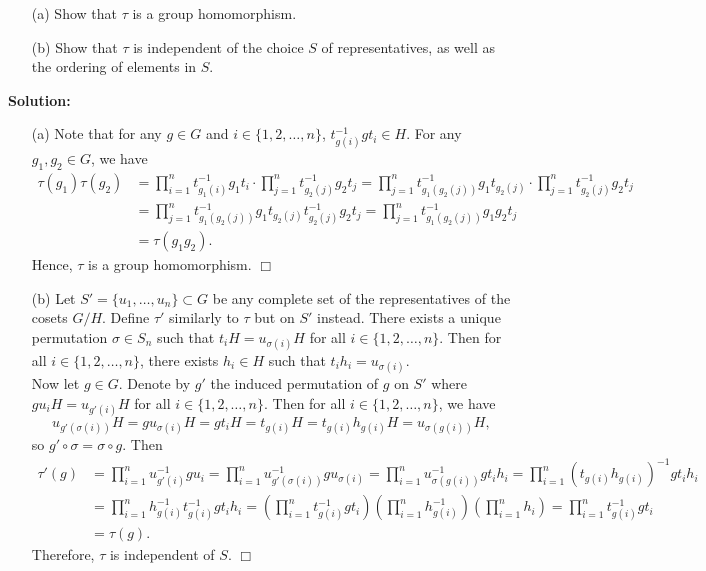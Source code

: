 \documentclass[12pt]{article}
\begin{document}
\begin{enumerate}
    \item[(a)] Show that $\tau$ is a group homomorphism. 
    \item[(b)] Show that $\tau$ is independent of the choice $S$ of representatives, as well as the ordering of elements in $S$.
\end{enumerate}
\noindent \textbf{Solution:} 
\begin{enumerate}
    \item[(a)] Note that for any $g \in G$ and $i \in \{1, 2, \dots, n\}$, $t_{g(i)}^{-1}gt_i \in H$. For any $g_1, g_2 \in G$, we have 
    \begin{align*}
        \tau(g_1)\tau(g_2) &= \prod_{i=1}^n t_{g_1(i)}^{-1}g_1t_i \cdot \prod_{j=1}^n t_{g_2(j)}^{-1}g_2t_j = \prod_{j=1}^n t_{g_1(g_2(j))}^{-1}g_1t_{g_2(j)} \cdot \prod_{j=1}^n t_{g_2(j)}^{-1}g_2t_j \\
        &= \prod_{j=1}^n t_{g_1(g_2(j))}^{-1}g_1t_{g_2(j)} t_{g_2(j)}^{-1}g_2t_j = \prod_{j=1}^n t_{g_1(g_2(j))}^{-1}g_1g_2t_j \\
        &= \tau(g_1g_2).
    \end{align*}
    Hence, $\tau$ is a group homomorphism. \hfill $\Box$
    \item[(b)] Let $S' = \{u_1, \dots, u_n\} \subset G$ be any complete set of the representatives of the cosets $G/H$. Define $\tau'$ similarly to $\tau$ but on $S'$ instead. There exists a unique permutation $\sigma \in S_n$ such that $t_iH = u_{\sigma(i)}H$ for all $i \in \{1, 2, \dots, n\}$. Then for all $i \in \{1, 2, \dots, n\}$, there exists $h_i \in H$ such that $t_ih_i = u_{\sigma(i)}$. \\

    Now let $g \in G$. Denote by $g'$ the induced permutation of $g$ on $S'$ where $gu_iH = u_{g'(i)}H$ for all $i \in \{1,2,\dots, n\}$. Then for all $i \in \{1, 2, \dots, n\}$, we have \[u_{g'(\sigma(i))}H = gu_{\sigma(i)}H = gt_iH = t_{g(i)}H = t_{g(i)}h_{g(i)}H = u_{\sigma(g(i))}H,\] so $g' \circ \sigma = \sigma \circ g$. Then 
    \begin{align*}
        \tau'(g) &= \prod_{i=1}^n u_{g'(i)}^{-1}gu_i = \prod_{i=1}^n u_{g'(\sigma(i))}^{-1}gu_{\sigma(i)} = \prod_{i=1}^n u_{\sigma(g(i))}^{-1}gt_ih_i = \prod_{i=1}^n (t_{g(i)}h_{g(i)})^{-1}gt_ih_i \\
        &= \prod_{i=1}^n h_{g(i)}^{-1}t_{g(i)}^{-1}gt_ih_i = \left(\prod_{i=1}^n t_{g(i)}^{-1}gt_i\right)\left(\prod_{i=1}^n h_{g(i)}^{-1}\right)\left(\prod_{i=1}^n h_i\right) = \prod_{i=1}^n t_{g(i)}^{-1}gt_i \\
        &= \tau(g).
    \end{align*}
    Therefore, $\tau$ is independent of $S$. \hfill $\Box$
\end{enumerate}
\end{document}
